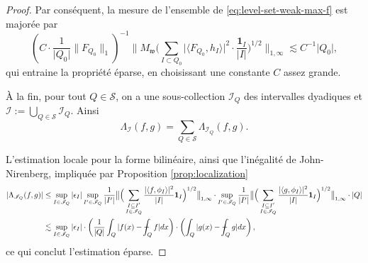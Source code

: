 \documentclass[11pt]{amsart}
\newcommand{\one}{\mathbf{1}}
\newcommand{\ii}{\mathscr}
\newcommand{\ic}{\mathcal}
\newcommand{\ds}{\displaystyle}
\def\Xint#1{\mathchoice
   {\XXint\displaystyle\textstyle{#1}}%
   {\XXint\textstyle\scriptstyle{#1}}%
   {\XXint\scriptstyle\scriptscriptstyle{#1}}%
   {\XXint\scriptscriptstyle\scriptscriptstyle{#1}}%
   \!\int}
\def\XXint#1#2#3{{\setbox0=\hbox{$#1{#2#3}{\int}$}
     \vcenter{\hbox{$#2#3$}}\kern-.5\wd0}}
\def\aver#1{\Xint-_{#1}}
\begin{document}
\begin{proof}
Par cons\'equent, la mesure de l'ensemble de \eqref{eq:level-set-weak-max-f} est major\'ee par
\[
\left(  C \cdot \frac{1}{\vert Q_0  \vert} \| F_{Q_0}  \|_1 \right)^{-1} \big\|   M_{\mathfrak{w}} \big( \sum_{I \subset Q_0 } \vert \langle F_{Q_0}, h_I \rangle  \vert^2 \cdot \frac{\one_I}{\vert  I \vert}   \big)^{1/2} \big\|_{1, \infty} \lesssim C^{-1} \vert  Q_0 \vert,
\]
qui entraine la propri\'et\'e \'eparse, en choisissant une constante $C$ assez grande.

\`A la fin, pour tout $Q \in \ic S$, on a une sous-collection $\ii I_Q$ des intervalles dyadiques et $\ds \ii I :=\bigcup_{Q \in \ic S} \ii I_Q$. Ainsi
\[
\Lambda_{\ii I}(f, g)=\sum_{Q \in \ic S} \Lambda_{\ii I_Q}(f, g).
\]

L'estimation locale pour la forme bilin\'eaire, ainsi que l'in\'egalit\'e de John-Nirenberg, impliqu\'ee par Proposition \ref{prop:localization}
{\fontsize{10.5}{10}
\begin{align*}
\vert \Lambda_{\ii I_{Q}}(f,g) \vert &\leq \sup_{I \in \ii I_Q} \vert \epsilon_I \vert \sup_{I' \in \ii I_{Q}} \frac{1}{\vert I' \vert} \big\|  \Big( \sum_{\substack{I \subseteq I' \\ I \in \ii I_{Q}}}  \frac{\vert \langle f, \phi_I \rangle \vert^2}{\vert I \vert}  \one_I \Big)^{1/2}   \big\|_{1, \infty} \cdot  \sup_{I' \in \ii I_{Q}} \frac{1}{\vert I' \vert} \big\|  \Big( \sum_{\substack{I \subseteq I' \\ I \in \ii I_{Q}}}  \frac{\vert \langle g, \phi_I \rangle \vert^2}{\vert I \vert}  \one_I \Big)^{1/2} \big\|_{1, \infty} \cdot \vert Q  \vert 
\\
&\lesssim \sup_{I \in \ii I_Q} \vert \epsilon_I \vert \cdot \left(\frac{1}{\vert Q \vert} \int_{Q} \vert  f(x) -\aver{Q} f \vert dx \right) \cdot \left(\int_{Q} \vert  g(x) -\aver{Q} g \vert dx\right),
\end{align*}}
ce qui conclut l'estimation \'eparse.
\end{proof}





%

\end{document}
